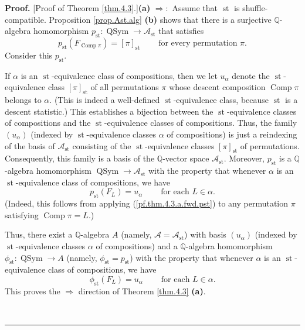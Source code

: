 \documentclass[numbers=enddot,12pt,final,onecolumn,notitlepage]{scrartcl}%
\theoremstyle{definition}
\newenvironment{proof}[1][Proof]{\noindent\textbf{#1.} }{\ \rule{0.5em}{0.5em}}
\begin{document}
\begin{proof}
[Proof of Theorem \ref{thm.4.3}.]\textbf{(a)} $\Longrightarrow:$ Assume that
$\operatorname*{st}$ is shuffle-compatible. Proposition \ref{prop.Ast.alg}
\textbf{(b)} shows that there is a surjective $\mathbb{Q}$-algebra
homomorphism $p_{\operatorname*{st}}:\operatorname*{QSym}\rightarrow
\mathcal{A}_{\operatorname*{st}}$ that satisfies
\begin{equation}
p_{\operatorname*{st}}\left(  F_{\operatorname*{Comp}\pi}\right)  =\left[
\pi\right]  _{\operatorname*{st}}\ \ \ \ \ \ \ \ \ \ \text{for every
permutation }\pi. \label{pf.thm.4.3.a.fwd.pst}%
\end{equation}
Consider this $p_{\operatorname*{st}}$.

If $\alpha$ is an $\operatorname*{st}$-equivalence class of compositions, then
we let $u_{\alpha}$ denote the $\operatorname*{st}$-equivalence class $\left[
\pi\right]  _{\operatorname*{st}}$ of all permutations $\pi$ whose descent
composition $\operatorname*{Comp}\pi$ belongs to $\alpha$. (This is indeed a
well-defined $\operatorname*{st}$-equivalence class, because
$\operatorname*{st}$ is a descent statistic.) This establishes a bijection
between the $\operatorname*{st}$-equivalence classes of compositions and the
$\operatorname*{st}$-equivalence classes of compositions. Thus, the family
$\left(  u_{\alpha}\right)  $ (indexed by $\operatorname*{st}$-equivalence
classes $\alpha$ of compositions) is just a reindexing of the basis of
$\mathcal{A}_{\operatorname*{st}}$ consisting of the $\operatorname*{st}%
$-equivalence classes $\left[  \pi\right]  _{\operatorname*{st}}$ of
permutations. Consequently, this family is a basis of the $\mathbb{Q}$-vector
space $\mathcal{A}_{\operatorname*{st}}$. Moreover, $p_{\operatorname*{st}}$
is a $\mathbb{Q}$-algebra homomorphism $\operatorname*{QSym}\rightarrow
\mathcal{A}_{\operatorname*{st}}$ with the property that whenever $\alpha$ is
an $\operatorname*{st}$-equivalence class of compositions, we have%
\[
p_{\operatorname*{st}}\left(  F_{L}\right)  =u_{\alpha}%
\ \ \ \ \ \ \ \ \ \ \text{for each }L\in\alpha.
\]
(Indeed, this follows from applying (\ref{pf.thm.4.3.a.fwd.pst}) to any
permutation $\pi$ satisfying $\operatorname*{Comp}\pi=L$.)

Thus, there exist a $\mathbb{Q}$-algebra $A$ (namely, $\mathcal{A}%
=\mathcal{A}_{\operatorname*{st}}$) with basis $\left(  u_{\alpha}\right)  $
(indexed by $\operatorname*{st}$-equivalence classes $\alpha$ of compositions)
and a $\mathbb{Q}$-algebra homomorphism $\phi_{\operatorname*{st}%
}:\operatorname*{QSym}\rightarrow A$ (namely, $\phi_{\operatorname*{st}%
}=p_{\operatorname*{st}}$) with the property that whenever $\alpha$ is an
$\operatorname*{st}$-equivalence class of compositions, we have%
\[
\phi_{\operatorname*{st}}\left(  F_{L}\right)  =u_{\alpha}%
\ \ \ \ \ \ \ \ \ \ \text{for each }L\in\alpha.
\]
This proves the $\Longrightarrow$ direction of Theorem \ref{thm.4.3}
\textbf{(a)}.


\end{proof}
\end{document}
